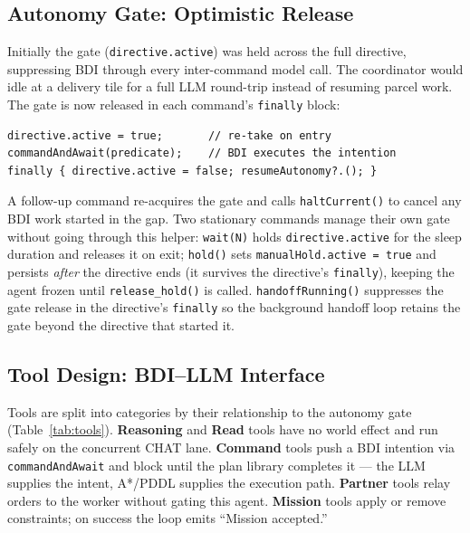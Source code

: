 \subsection{Autonomy Gate: Optimistic Release}
Initially the gate (\texttt{directive.active}) was held across the full directive, suppressing BDI through every inter-command model call. The coordinator would idle at a delivery tile for a full LLM round-trip instead of resuming parcel work. The gate is now released in each command's \texttt{finally} block:
\begin{verbatim}
directive.active = true;       // re-take on entry
commandAndAwait(predicate);    // BDI executes the intention
finally { directive.active = false; resumeAutonomy?.(); }
\end{verbatim}
A follow-up command re-acquires the gate and calls \texttt{haltCurrent()} to cancel any BDI work started in the gap. Two stationary commands manage their own gate without going through this helper: \texttt{wait(N)} holds \texttt{directive.active} for the sleep duration and releases it on exit; \texttt{hold()} sets \texttt{manualHold.active = true} and persists \textit{after} the directive ends (it survives the directive's \texttt{finally}), keeping the agent frozen until \texttt{release\_hold()} is called. \texttt{handoffRunning()} suppresses the gate release in the directive's \texttt{finally} so the background handoff loop retains the gate beyond the directive that started it.

\subsection{Tool Design: BDI–LLM Interface}
Tools are split into categories by their relationship to the autonomy gate (Table~\ref{tab:tools}). \textbf{Reasoning} and \textbf{Read} tools have no world effect and run safely on the concurrent CHAT lane. \textbf{Command} tools push a BDI intention via \texttt{commandAndAwait} and block until the plan library completes it — the LLM supplies the intent, A*/PDDL supplies the execution path. \textbf{Partner} tools relay orders to the worker without gating this agent. \textbf{Mission} tools apply or remove constraints; on success the loop emits ``Mission accepted.''

